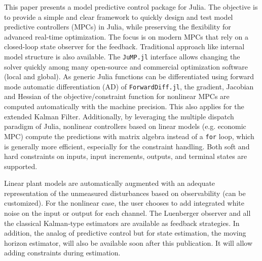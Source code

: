 This paper presents a model predictive control package for Julia. The objective is to provide a simple and clear framework to quickly design and test model predictive controllers (MPCs) in Julia, while preserving the flexibility for advanced real-time optimization. The focus is on modern MPCs that rely on a closed-loop state observer for the feedback. Traditional approach like internal model structure is also available. The \texttt{JuMP.jl} interface allows changing the solver quickly among  many open-source and commercial optimization software (local and global). As generic Julia functions can be differentiated using forward mode automatic differentiation (AD) of \texttt{ForwardDiff.jl}, the gradient, Jacobian and Hessian of the objective/constraint function for nonlinear MPCs are computed automatically with the machine precision. This also applies for the extended Kalman Filter. Additionally, by leveraging the multiple dispatch paradigm of Julia, nonlinear
controllers based on linear models (e.g. economic MPC) compute the predictions with matrix algebra instead of a \texttt{for} loop, which is generally more efficient, especially for the constraint handling. Both soft and hard constraints on inputs, input increments, outputs, and terminal states are supported. 

Linear plant models are automatically augmented with an adequate representation of the unmeasured disturbances based on observability (can be customized). For the nonlinear case, the user chooses to add integrated white noise on the input or output for each channel. The Luenberger observer and all the classical Kalman-type estimators are available as feedback strategies. In addition, the analog of predictive control but for state estimation, the moving horizon estimator, will also be available soon after this publication. It will allow adding constraints during estimation.

